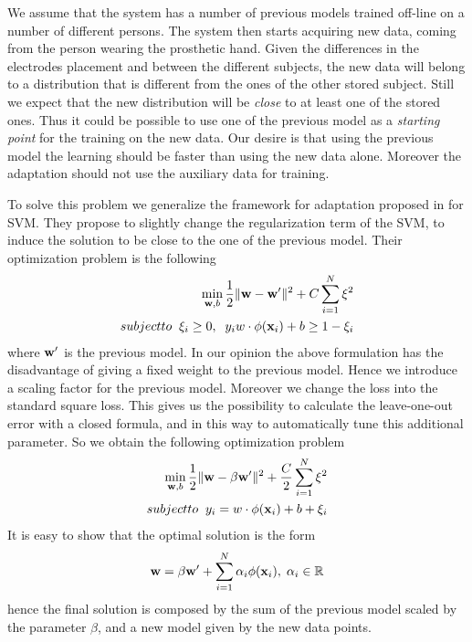 We assume that the system has a number of previous models trained off-line on a
number of different persons. The system then starts acquiring new data, coming
from the person wearing the prosthetic hand. Given the differences in the
electrodes placement and between the different subjects, the new data will
belong to a distribution that is different from the ones of the other stored
subject. Still we expect that the new distribution will be \emph{close} to at
least one of the stored ones. Thus
it could be possible to use one of the previous model as a
\emph{starting point} for the training on the new data.
Our desire is that using the previous model the learning should be faster
than using the new data alone. Moreover the adaptation should not use the
auxiliary data for training.

To solve this problem we generalize the framework for adaptation proposed in
\cite{YangYH07} for SVM. They propose to slightly change the regularization term
of the SVM, to induce the solution to be close to the one of the previous model.
Their optimization problem is the following
\begin{align}
\min_{\ww,b} \frac{1}{2} \|\ww- \ww'\|^2 + C \sum_{i=1}^N \xi^2 \\
\mbox{subject to} \;\; \xi_i \geq 0,\;\; y_i w \cdot \phi(\xx_i) + b \geq 1-\xi_i
\label{eq:opt_prob_orig}
\end{align}
\noindent where $\mathbf{w}'$ is the previous model.
In our opinion the above formulation has the disadvantage of giving a fixed
weight to the previous model. Hence we introduce a scaling factor for the previous
model. Moreover we change the loss into the standard square loss. This gives
us the possibility to calculate the leave-one-out error with a closed formula, and
in this way to automatically tune this additional parameter.
So we obtain the following optimization problem
\begin{align}
\min_{\ww,b} \frac{1}{2} \|\ww- \beta \ww'\|^2 + \frac{C}{2} \sum_{i=1}^N \xi^2 \\
\mbox{subject to} \;\; y_i = w \cdot \phi(\xx_i) + b + \xi_i
\label{eq:opt_prob}
\end{align}
It is easy to show that the optimal solution is the form
\begin{equation}
\mathbf{w} = \beta \mathbf{w}' + \sum_{i=1}^N \alpha_i \phi(\mathbf{x}_i), \; \alpha_i \in \mathbb{R}
\end{equation}
\noindent hence the final solution is composed by the sum of the previous model
scaled by the parameter $\beta$, and a new model given by the new data points.
